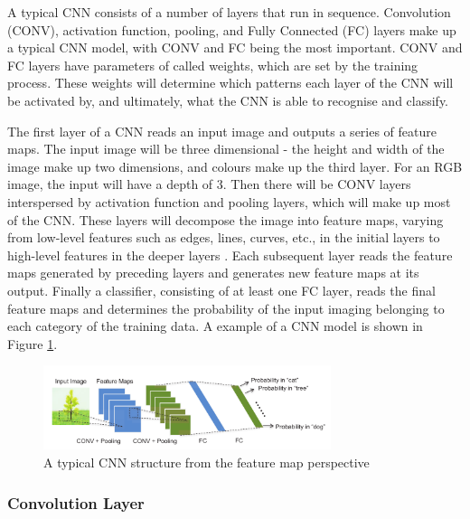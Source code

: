 \documentclass[12pt]{article}
\begin{document}
A typical CNN consists of a number of layers that run in sequence. Convolution (CONV), activation function, pooling, and Fully Connected (FC) layers make up a typical CNN model, with CONV and FC being the most important. CONV and FC layers have parameters of called weights, which are set by the training process. These weights will determine which patterns each layer of the CNN will be activated by, and ultimately, what the CNN is able to recognise and classify. 

The first layer of a CNN reads an input image and outputs a series of feature maps. The input image will be three dimensional - the height and width of the image make up two dimensions, and colours make up the third layer. For an RGB image, the input will have a depth of 3. Then there will be CONV layers interspersed by activation function and pooling layers, which will make up most of the CNN. These layers will decompose the image into feature maps, varying from low-level features such as edges, lines, curves, etc., in the initial layers to high-level features in the deeper layers \cite{fpgaCnnAccelerator}. Each subsequent layer reads the feature maps generated by preceding layers and generates new feature maps at its output. Finally a classifier, consisting of at least one FC layer, reads the final feature maps and determines the probability of the input imaging belonging to each category of the training data. A example of a CNN model is shown in Figure \ref{fig:typicalCNN}.
\begin{figure}

\centering
\includegraphics[width=0.75\textwidth]{../figures/typicalCnn}

  \caption{A typical CNN structure from the feature map perspective \cite{embeddedFpgaCnn} \label{fig:typicalCNN}}

\end{figure}

\subsubsection{Convolution Layer}
\label{sec:Background-CNN-Conv}
\vspace{-12pt}
\end{document}
